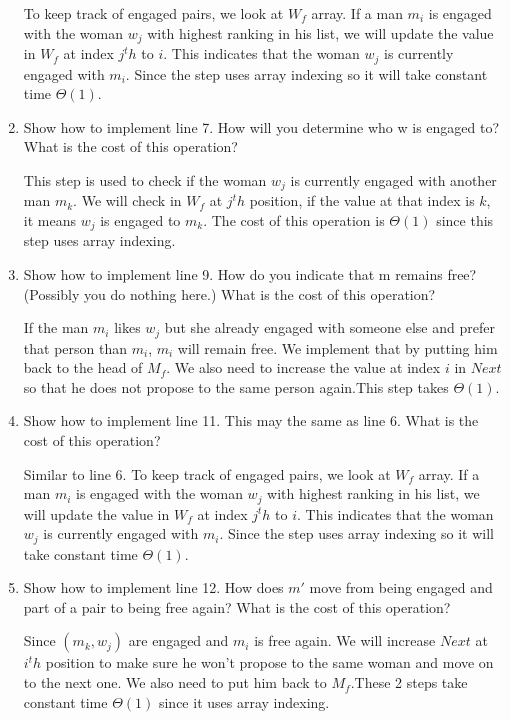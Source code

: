 \documentclass{cpsc413Solutions}
\begin{document}
\begin{problemlist}
\begin{problem}
\begin{answer}
\begin{enumerate}
    To keep track of engaged pairs, we look at $W_f$ array. If a man $m_i$ is engaged with the woman $w_j$ with highest ranking in his list, we will update the value in $W_f$ at index $j^th$ to $i$. This indicates that the woman $w_j$ is currently engaged with $m_i$. Since the step uses array indexing so it will take constant time $\Theta(1)$.
    
    \item Show how to implement line 7. How will you determine who w is engaged to? What is the cost of this operation? 
    
    This step is used to check if the woman $w_j$ is currently engaged with another man $m_k$. We will check in $W_f$ at $j^th$ position, if the value at that index is $k$, it means $w_j$ is engaged to $m_k$. The cost of this operation is $\Theta(1)$ since this step uses array indexing.
    
    \item Show how to implement line 9. How do you indicate that m remains free? (Possibly you do nothing here.) What is the cost of this operation?
    
    If the man $m_i$ likes $w_j$ but she already engaged with someone else and prefer that person than $m_i$, $m_i$ will remain free. We implement that by putting him back to the head of $M_f$. We also need to increase the value at index $i$ in $Next$ so that he does not propose to the same person again.This step takes $\Theta(1)$.
    
    \item Show how to implement line 11. This may the same as line 6. What is the cost of this operation? 
    
    Similar to line 6. To keep track of engaged pairs, we look at $W_f$ array. If a man $m_i$ is engaged with the woman $w_j$ with highest ranking in his list, we will update the value in $W_f$ at index $j^th$ to $i$. This indicates that the woman $w_j$ is currently engaged with $m_i$. Since the step uses array indexing so it will take constant time $\Theta(1)$.
    
    \item Show how to implement line 12. How does $m'$ move from being engaged and part of a pair to being free again? What is the cost of this operation?
    
    Since $(m_k,w_j)$ are engaged and $m_i$ is free again. We will increase $Next$ at $i^th$ position to make sure he won't propose to the same woman and move on to the next one. We also need to put him back to $M_f$.These 2 steps take constant time $\Theta(1)$ since it uses array indexing.
    

\end{enumerate}
\end{answer}
\end{problem}
\end{problemlist}
\end{document}
